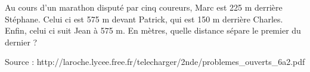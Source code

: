 
Au cours d'un marathon disputé par cinq coureurs, Marc est 225 m derrière Stéphane. Celui ci  est  575  m  devant  Patrick,  qui  est  150  m  derrière Charles.  Enfin,  celui ci  suit  Jean  à  575  m.  En  mètres, quelle distance sépare le premier du dernier ?

\hfill{{\scriptsize Source : http://laroche.lycee.free.fr/telecharger/2nde/problemes\_ouverts\_6a2.pdf}}